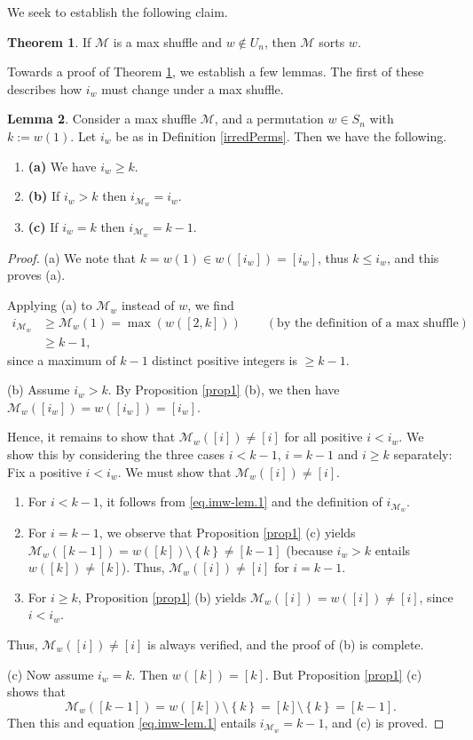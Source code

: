 \documentclass[final,nomarks]{dmtcs-episciences}
\theoremstyle{definition}
\newtheorem{thm}{Theorem}[section]
\newtheorem{lem}[thm]{Lemma}
\theoremstyle{definition}
\theoremstyle{remark}
\newcommand{\M}{\mathcal{M}} %
\newcommand{\Mw}{\mathcal{M}_w} %
\newcommand{\tup}[1]{\left( #1 \right)}
\newcommand{\set}[1]{\left\{ #1 \right\}}
\begin{document}
We seek to establish the following claim.
\begin{thm}
    \label{mshufSorts}
    If $ \M $ is a max shuffle and $ w \not\in U_{n} $, then $ \M $ sorts $ w $.
\end{thm}
Towards a proof of Theorem \ref{mshufSorts}, we establish a few lemmas. The first of these describes how $i_w$ must change under a max shuffle. 
\begin{lem}
    \label{imw-lem}
    Consider a max shuffle $\M$, and a permutation $w \in S_n$ with $k := w(1)$. Let $i_w$ be as in Definition \ref{irredPerms}. Then we have the following.
    \begin{enumerate}[]
        \item\textbf{(a)} We have $i_w \ge k$.
        \item\textbf{(b)} If $i_w > k$ then $i_{\Mw} = i_w$.
        \item\textbf{(c)} If $i_w = k$ then $i_{\Mw} = k - 1$.
    \end{enumerate}
\end{lem}

\begin{proof}
(a) We note that $k = w(1) \in w([i_w]) = [i_w]$, thus $k \le i_w$, and this proves (a).

Applying (a) to $\Mw$ instead of $w$, we find
\begin{align}
i_{\Mw} &\ge \Mw(1) = \max\tup{w([2,k])}
\qquad \left(\text{by the definition of a max shuffle}\right) \nonumber\\
&\ge k-1, \label{eq.imw-lem.1}
\end{align}
since a maximum of $k-1$ distinct positive integers is $\geq k-1$.
\medskip

(b) Assume $i_w > k$.
By Proposition \ref{prop1} (b), we then have $\Mw([i_w]) = w([i_w]) = [i_w]$.

Hence, it remains to show that $\Mw([i]) \ne [i] $ for all positive $i < i_w$. We show this by considering the three cases $i < k-1$, $i = k-1$ and $i \geq k$ separately:
Fix a positive $i < i_w$. We must show that $\Mw([i]) \ne [i] $.
\begin{enumerate}
\item For $i < k-1$, it follows from \eqref{eq.imw-lem.1} and the definition of $i_{\Mw}$.
\item For $i = k-1$, we observe that Proposition \ref{prop1} (c) yields $\Mw([k-1]) = w([k]) \setminus \set{k} \ne [k-1]$ (because $i_w > k$ entails $w([k]) \ne [k]$). Thus, $\Mw([i]) \ne [i]$ for $i = k-1$.
\item For $i \geq k$,  Proposition \ref{prop1} (b) yields $\Mw([i]) = w([i]) \ne [i]$, since $i < i_w$.
\end{enumerate}
Thus, $\Mw([i]) \ne [i] $ is always verified, and the proof of (b) is complete.
\medskip

(c) Now assume $i_w = k$. Then $w([k]) = [k]$. But Proposition \ref{prop1} (c) shows that
\[
\Mw([k-1]) = w([k]) \setminus \set{k} = [k]\setminus \set{k} = [k-1].
\]
Then this and equation \eqref{eq.imw-lem.1} entails $i_{\Mw} = k-1$, and (c) is proved.
\end{proof}
\end{document}
